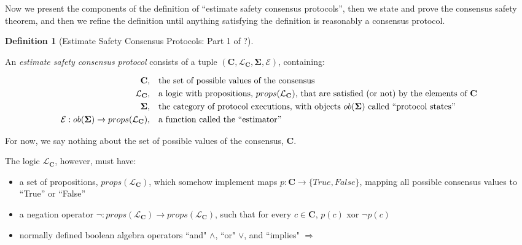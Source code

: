 \documentclass{article}
\theoremstyle{definition}
\newtheorem{defn}{Definition}[section]
\newcommand{\cat}{
	\mathbf
}
\begin{document}
Now we present the components of the definition of ``estimate safety consensus protocols'', then we state and prove the consensus safety theorem, and then we refine the definition until anything satisfying the definition is reasonably a consensus protocol.

\vspace{5mm}

\begin{defn}[Estimate Safety Consensus Protocols: Part 1 of ?]

\begin{description}An \emph{estimate safety consensus protocol} consists of a tuple $(\cat{C}, \mathcal{L}_\cat{C}, \cat{\Sigma}, \mathcal{E})$, containing:

\begin{align*}
\cat{C}, & &&\text{the set of possible values of the consensus}\\
\mathcal{L}_\cat{C}, & &&\text{a logic with propositions, $props(\mathcal{L}_\cat{C})$, that are satisfied (or not) by the elements of $\cat{C}$}\\
\cat{\Sigma}, & &&\text{the category of protocol executions, with objects $ob(\cat{\Sigma})$ called ``protocol states''}\\
\mathcal{E} : ob(\cat{\Sigma}) \to props(\mathcal{L}_\cat{C}), & &&\text{a function called the ``estimator''}
\end{align*}

For now, we say nothing about the set of possible values of the consensus, $\cat{C}$.

The logic $\mathcal{L}_\cat{C}$, however, must have:



\begin{itemize}
\item a set of propositions, $props(\mathcal{L}_\cat{C})$, which somehow implement maps $p:\cat{C} \to \{True, False\}$, mapping all possible consensus values to ``True'' or ``False''
\item a negation operator $\neg: props(\mathcal{L}_\cat{C}) \to props(\mathcal{L}_\cat{C})$, such that for every $c \in \cat{C}$, $p(c)$ xor $\neg{p}(c)$
\item normally defined boolean algebra operators ``and" $\land$, ``or" $\lor$, and ``implies" $\Rightarrow$
\end{itemize}


\end{description}
\end{defn}
\end{document}
